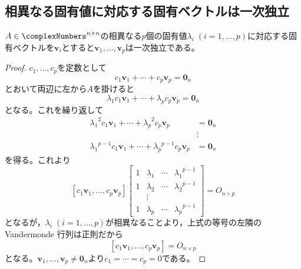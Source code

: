         \subsection{相異なる固有値に対応する固有ベクトルは一次独立}
            \label{相異なる固有値に対応する固有ベクトルは一次独立}
            \begin{shadebox}
                $A\in\complexNumbers^{n\times n}$の相異なる$p$個の固有値$\lambda_i\;(i=1,\dotsc,p)$に対応する固有ベクトルを$\bm{v}_i$とすると$\bm{v}_1,\dotsc,\bm{v}_p$は一次独立である。
            \end{shadebox}
            \begin{proof}
                \quad\par
                $c_1,\dotsc,c_p$を定数として
                \[c_1\bm{v}_1 + \dotsb + c_p\bm{v}_p = \bm{0}_n\]
                とおいて両辺に左から$A$を掛けると
                \[\lambda_1 c_1\bm{v}_1 + \dotsb + \lambda_p c_p\bm{v}_p = \bm{0}_n\]
                となる。これを繰り返して
                \begin{align*}
                    {\lambda_1}^2 c_1\bm{v}_1 + \dotsb + {\lambda_p}^2 c_p\bm{v}_p &= \bm{0}_n \\
                    & \vdots \\
                    {\lambda_1}^{p-1} c_1\bm{v}_1 + \dotsb + {\lambda_p}^{p-1} c_p\bm{v}_p &= \bm{0}_n
                \end{align*}
                を得る。これより
                \[
                    [c_1\bm{v}_1,\dotsc,c_p\bm{v}_p]
                    \begin{bmatrix}
                        1 & \lambda_1 & \cdots & {\lambda_1}^{p-1} \\
                        1 & \lambda_2 & \cdots & {\lambda_2}^{p-1} \\
                        & \vdots & \\
                        1 & \lambda_p & \cdots & {\lambda_p}^{p-1}
                    \end{bmatrix}
                    = O_{n\times p}
                \]
                となるが，$\lambda_i\;(i=1,\dotsc,p)$が相異なることより，上式の等号の左隣の Vandermonde 行列は正則だから
                \[ [c_1\bm{v}_1,\dotsc,c_p\bm{v}_p] = O_{n\times p} \]
                となる。$\bm{v}_1,\dotsc,\bm{v}_p\neq\bm{0}_n$より$c_1=\dotsb=c_p=0$である。
            \end{proof}
